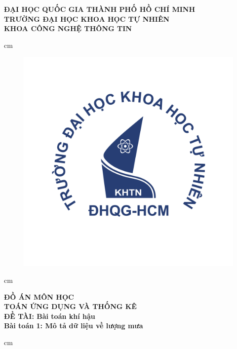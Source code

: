 \documentclass[a4paper]{article}
\author{Nguyễn Văn Lộc}
\begin{document}
\fancyhf{}
\chead{}
\cfoot{\thepage}
\rfoot{}
\lfoot{}
\pagestyle{fancy}
\begin{titlepage}
\begin{mybox}
\begin{center}
\fontsize{12}{12}\selectfont
\textbf{ĐẠI HỌC QUỐC GIA THÀNH PHỐ HỒ CHÍ MINH}\\
\textbf{TRƯỜNG ĐẠI HỌC KHOA HỌC TỰ NHIÊN}\\
\textbf{KHOA CÔNG NGHỆ THÔNG TIN}
\end{center}
 cm
\begin{figure}[H]
\begin{center}
\includegraphics[scale=0.25]{images/logo}
\end{center}
\end{figure}
 cm
\begin{center}
\fontsize{18}{14}\selectfont
\textbf{ĐỒ ÁN MÔN HỌC}\\
\fontsize{26}{16}\selectfont
\textbf{TOÁN ỨNG DỤNG VÀ THỐNG KÊ}\\
\fontsize{18}{12}\selectfont
\textbf{ĐỀ TÀI: Bài toán khí hậu}\\
\textbf{Bài toán 1: Mô tả dữ liệu về lượng mưa}
\end{center}
 cm
\fontsize{14}{12}\selectfont

\end{mybox}
\end{titlepage}
\end{document}
